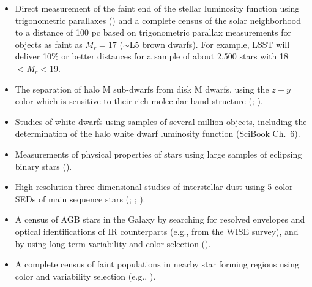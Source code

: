 \begin{itemize}
\item Direct measurement of the faint end of the stellar luminosity function
          using trigonometric parallaxes (\cite{Reid2002}) and a complete census of the
          solar neighborhood to a distance of 100 pc based on trigonometric parallax measurements for objects as faint as
          $M_r=17$ ($\sim$L5 brown dwarfs). For example, LSST will deliver 10\% or better distances for a sample of about 2,500 stars
          with 18$<M_r<$19. %
\item The separation of halo M sub-dwarfs from disk M dwarfs, using the $z-y$ color which is sensitive to their rich molecular band
          structure (\cite{West2011}; \cite{Bochanski2013}).
\item Studies of white dwarfs using samples of several million objects, including the determination of the halo white dwarf luminosity
          function (SciBook Ch.~6).
\item Measurements of physical properties of stars using large samples of eclipsing binary stars (\cite{Stassun2013}).
\item High-resolution three-dimensional studies of interstellar dust using 5-color
          SEDs of main sequence stars (\cite{PlanckCollaboration2011}; \cite{Berry2012}; \cite{Green2014}).
\item A census of AGB stars in the Galaxy by searching for resolved envelopes and optical  identifications of IR counterparts
         (e.g., from the WISE survey), and by using long-term variability and color selection (\cite{Ivezic2007c}).
\item A complete census of faint populations in nearby star forming regions using
          color and variability selection (e.g., \cite{Briceno2005}).
\end{itemize}


